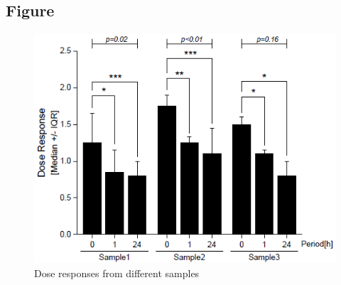 \documentclass{article}
\begin{document}
\subsection{Figure}
\begin{figure}
  \centering
  \includegraphics[scale=0.5]{fig/fig1.png}
  \caption{Dose responses from different samples}
  \label{fig:dose_response}
\end{figure}
\end{document}
